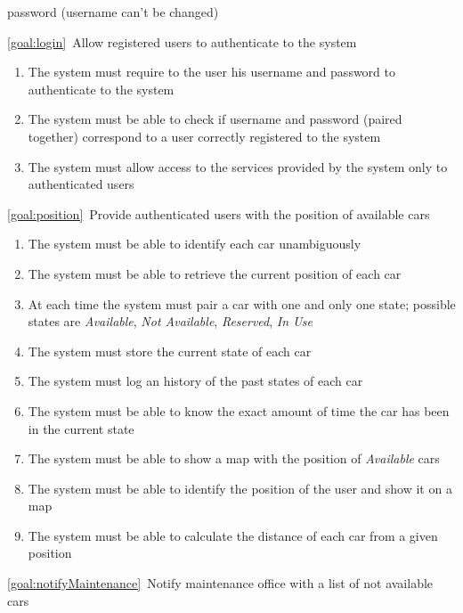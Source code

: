 \begin{description}
\begin{enumerate}[label=\textbf{R\arabic*}]
   				password (username can't be changed)
  			\end{enumerate}
		\item \ref{goal:login}\ Allow registered users to authenticate to the system
			\begin{enumerate}[resume*]
  				\item The system must require to the user his username and password to authenticate
  				to the system
   				\item The system must be able to check if username and password (paired together)
   				correspond to a user correctly registered to the system
   				\item The system must allow access to the services provided by the system only to
   				authenticated users 
			\end{enumerate}
		\item \ref{goal:position}\ Provide authenticated users with the position of available cars
			\begin{enumerate}[resume*]
				\item The system must be able to identify each car unambiguously
  				\item The system must be able to retrieve the current position of each car
  				\item At each time the system must pair a car with one and only one state; possible
  				states are \emph{Available}, \emph{Not Available}, \emph{Reserved}, \emph{In Use}
   				\item The system must store the current state of each car
   				\item The system must log an history of the past states of each car 
   				\item The system must be able to know the exact amount of time the car has been in
   				the current state
   				\item The system must be able to show a map with the position of \emph{Available}
   				cars
  				\item The system must be able to identify the position of the user and show it on a
  				map
   				\item The system must be able to calculate the distance of each car from a given
   				position
  			\end{enumerate}
		\item \ref{goal:notifyMaintenance}\ Notify maintenance office with a list of not available
		cars
			\begin{enumerate}[resume*]

\end{enumerate}
\end{description}
